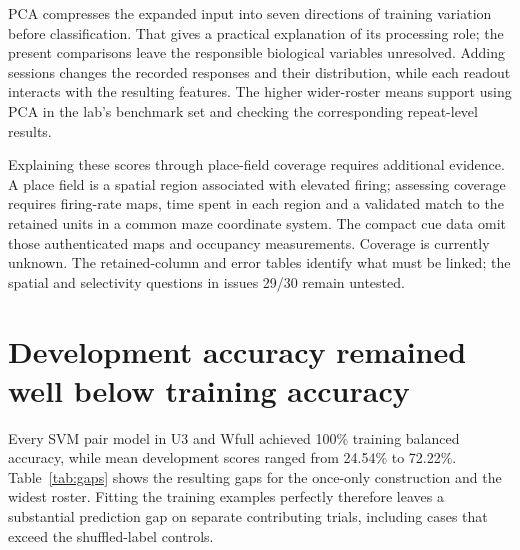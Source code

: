 \documentclass[10pt,a4paper]{article}
\begin{document}
PCA compresses the expanded input into seven directions of training variation before classification. That gives a practical explanation of its processing role; the present comparisons leave the responsible biological variables unresolved. Adding sessions changes the recorded responses and their distribution, while each readout interacts with the resulting features. The higher wider-roster means support using PCA in the lab's benchmark set and checking the corresponding repeat-level results.

Explaining these scores through place-field coverage requires additional evidence. A place field is a spatial region associated with elevated firing; assessing coverage requires firing-rate maps, time spent in each region and a validated match to the retained units in a common maze coordinate system. The compact cue data omit those authenticated maps and occupancy measurements. Coverage is currently unknown. The retained-column and error tables identify what must be linked; the spatial and selectivity questions in issues 29/30 remain untested.

\clearpage
\section{Development accuracy remained well below training accuracy}
Every SVM pair model in U3 and Wfull achieved 100\% training balanced accuracy, while mean development scores ranged from 24.54\% to 72.22\%. Table~\ref{tab:gaps} shows the resulting gaps for the once-only construction and the widest roster. Fitting the training examples perfectly therefore leaves a substantial prediction gap on separate contributing trials, including cases that exceed the shuffled-label controls.
\end{document}
